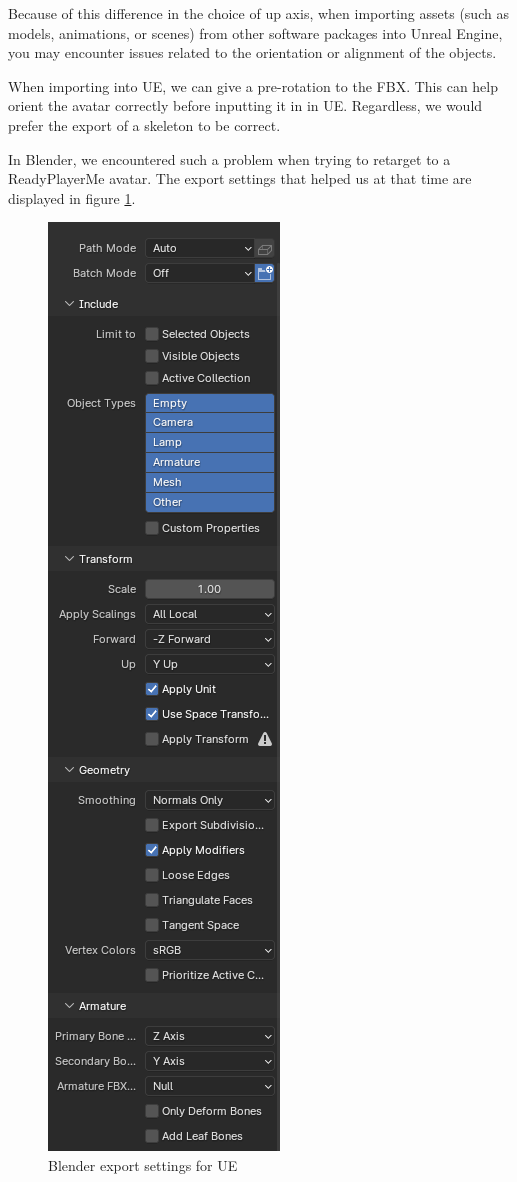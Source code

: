 \documentclass{uva-inf-article}
\begin{document}
Because of this difference in the choice of up axis, when importing assets (such as models, animations, or scenes) from other software packages into Unreal Engine, you may encounter issues related to the orientation or alignment of the objects.

When importing into UE, we can give a pre-rotation to the FBX. This can help orient the avatar correctly before inputting it in in UE.
Regardless, we would prefer the export of a skeleton to be correct.

In Blender, we encountered such a problem when trying to retarget to a ReadyPlayerMe avatar. The export settings that helped us at that time are displayed in figure 
\ref{fig:blenderSettings}.
\begin{figure}[hbt!]
    \centering
    \includegraphics[height=0.9\textheight]{imgs/settings.png}
    \caption{Blender export settings for UE}
    \label{fig:blenderSettings}
\end{figure}
\end{document}
